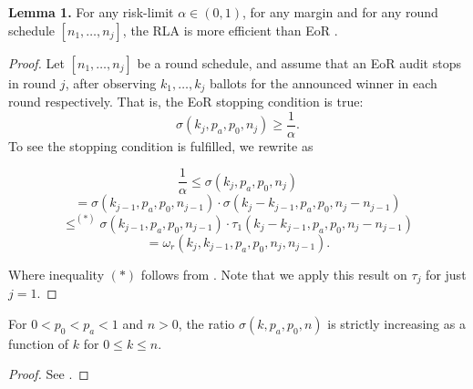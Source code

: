 \textbf{Lemma 1.}
For any risk-limit $\alpha \in (0, 1)$, for any margin
and for any round schedule $[n_1, \ldots, n_j]$, 
the \Providence RLA is more efficient than EoR \BRAVO.

\begin{proof}
Let $[n_1, \ldots, n_j]$ be a round schedule, and assume that an EoR \BRAVO audit stops in round $j$, after observing $k_1, \ldots, k_j$ ballots for the announced winner in each round respectively.
That is, the EoR \BRAVO stopping condition is true:
$$\sigma(k_j,p_a,p_0,n_j) \ge \frac{1}{\alpha}.$$
To see the \Providence stopping condition is fulfilled, we rewrite as 




\[
 \frac{1}{\alpha} \leq \sigma(k_{j}, p_a, p_0, n_{j}) 
\]
\[
 = \sigma(k_{j-1}, p_a, p_0, n_{j-1}) \cdot \sigma(k_j - k_{j-1}, p_a, p_0, n_j - n_{j-1})  
\]
\[
 \leq^{(*)} \sigma(k_{j-1}, p_a, p_0, n_{j-1}) \cdot \tau_1(k_j - k_{j-1}, p_a, p_0, n_j - n_{j-1}) 
\]
\[
 = \omega_r(k_j, k_{j-1}, p_a, p_0, n_j, n_{j-1}).
\]

Where inequality $(*)$ follows from \cite[Theorem 6]{arxiv_athena}. Note that we apply this result on $\tau_j$ for just $j=1$.


% 
% 
% 
\end{proof}
\begin{lemma}
    \label{lemma:sigma_increasing}
For $0<p_0< p_a< 1$ and $n>0$, the ratio $\sigma(k,p_a,p_0,n)$ is strictly increasing as a function of $k$ for $0\le k\le n$.
\end{lemma}
\begin{proof}
See \cite[Lemma 4]{usenix_minerva}. 
\end{proof}

